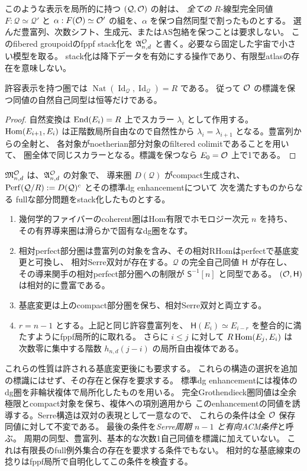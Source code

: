 このような表示を局所的に持つ $(\mathcal Q,\mathcal O)$ の射は、
\emph{全ての} $R$-線型完全同値 $F:\mathcal Q\simeq\mathcal Q'$ と
$\alpha:F(\mathcal O)\simeq\mathcal O'$ の組を、$\alpha$ を保つ自然同型で割ったものとする。
選んだ豊富列、次数シフト、生成元、またはAS包絡を保つことは要求しない。
このfibered groupoidのfppf stack化を
$\mathfrak A^{\mathcal O}_{n,d}$ と書く。必要なら固定した宇宙で小さい模型を取る。
stack化は降下データを有効にする操作であり、有限型atlasの存在を意味しない。

\begin{lemma}[標識と自然自己同型]
\label{lem:marking-removes-two-aut}
許容表示を持つ圏では
$\operatorname{Nat}(\operatorname{Id}_{\mathcal Q},\operatorname{Id}_{\mathcal Q})=R$ である。
従って $\mathcal O$ の標識を保つ同値の自然自己同型は恒等だけである。
\end{lemma}
\begin{proof}
自然変換は $\operatorname{End}(E_i)=R$ 上でスカラー $\lambda_i$ として作用する。
$\operatorname{Hom}(E_{i+1},E_i)$ は正階数局所自由なので自然性から
$\lambda_i=\lambda_{i+1}$ となる。豊富列からの全射と、
各対象がnoetherian部分対象のfiltered colimitであることを用いて、
圏全体で同じスカラーとなる。標識を保つなら $E_0=\mathcal O$ 上で1である。
\end{proof}

\begin{definition}
\label{def:nc-dp-stack}
$\mathfrak M^{\mathcal O}_{n,d}$ は、$\mathfrak A^{\mathcal O}_{n,d}$ の対象で、
導来圏 $D(\mathcal Q)$ がcompact生成され、
$\operatorname{Perf}(\mathcal Q/R):=D(\mathcal Q)^c$ とその標準dg enhancementについて
次を満たすものからなる
fullな部分問題をstack化したものとする。
\begin{enumerate}
\item 幾何学的ファイバーのcoherent圏はHom有限でホモロジー次元 $n$ を持ち、
      その有界導来圏は滑らかで固有なdg圏をなす。
\item 相対perfect部分圏は豊富列の対象を含み、その相対RHomはperfectで基底変更と可換し、
      相対Serre双対が存在する。$\mathcal Q$ の完全自己同値 $\mathsf H$ が存在し、
      その導来関手の相対perfect部分圏への制限が $\mathsf S^{-1}[n]$ と同型である。
      $(\mathcal O,\mathsf H)$ は相対的に豊富である。
\item 基底変更は上のcompact部分圏を保ち、相対Serre双対と両立する。
\item $r=n-1$ とする。上記と同じ許容豊富列を、
      $\mathsf H(E_i)\simeq E_{i-r}$ を整合的に満たすようにfppf局所的に取れる。
      さらに $i\le j$ に対して $R\operatorname{Hom}(E_j,E_i)$ は
      次数零に集中する階数 $h_{n,d}(j-i)$ の局所自由複体である。
\end{enumerate}
これらの性質は許される基底変更後にも要求する。
これらの構造の選択を追加の標識にはせず、その存在と保存を要求する。
標準dg enhancementには複体のdg圏を非輪状複体で局所化したものを用いる。
完全Grothendieck圏同値は全余極限とcompact対象を保ち、複体への項別適用から
このenhancementの同値を誘導する。Serre構造は双対の表現として一意なので、
これらの条件は全 $\mathcal O$ 保存同値に対して不変である。
最後の条件を\emph{Serre周期 $n-1$ と有向ACM条件}と呼ぶ。
周期の同型、豊富列、基本的な次数1自己同値を標識に加えていない。
これは有限長のfull例外集合の存在を要求する条件でもない。
相対的な基底線束の捻りはfppf局所で自明化してこの条件を検査する。
\end{definition}

